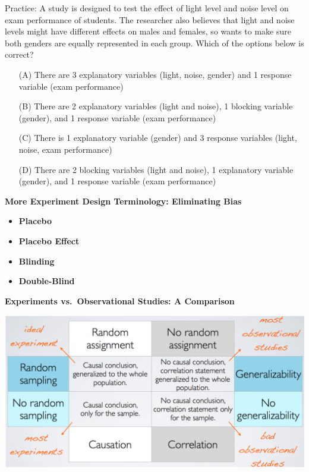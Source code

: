 \documentclass[11pt,letterpaper,twoside]{article}
\begin{document}
\newpage

Practice: A study is designed to test the effect of light level and noise level on exam performance of students. The researcher also believes that light and noise levels might have different effects on males and females, so wants to make sure both genders are equally represented in each group. Which of the options below is correct?

\begin{enumerate}
\item[(A)] There are 3 explanatory variables (light, noise, gender) and 1 response variable (exam performance)

\item[(B)] There are 2 explanatory variables (light and noise), 1 blocking variable (gender), and 1 response variable (exam performance)

\item[(C)] There is 1 explanatory variable (gender) and 3 response variables (light, noise, exam performance)

\item[(D)] There are 2 blocking variables (light and noise), 1 explanatory variable (gender), and 1 response variable (exam performance) \vspace{10pt}
\end{enumerate} 

{\bf More Experiment Design Terminology: Eliminating Bias}

\begin{itemize}

\item {\bf Placebo} \vspace{60pt}

\item {\bf Placebo Effect} \vspace{60pt}

\item {\bf Blinding} \vspace{60pt}

\item {\bf Double-Blind} \vspace{60pt}

\end{itemize}

\newpage

{\bf Experiments vs.\ Observational Studies: A Comparison} \vspace{6pt}

\begin{center}
\includegraphics[scale=0.75]{images/random.png}
\end{center}
\end{document}
